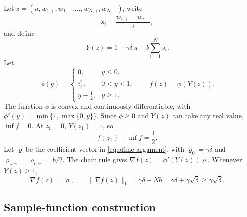 \documentclass[11pt,letterpaper]{article}
\theoremstyle{definition}
\newcommand{\grad}{\nabla}
\begin{document}
Let
$z=(u,w_{1,+},w_{1,-},\ldots,w_{N,+},w_{N,-})$,
write
\[
s_i=\frac{w_{i,+}+w_{i,-}}{2},
\]
and define
\begin{equation}
Y(z)=1+\gamma\delta\,u+b\sum_{i=1}^N s_i.
\label{eq:affine-argument}
\end{equation}
Let
\begin{equation}
\phi(y)=
\begin{cases}
0,&y\le0,\\
\frac{y^2}{2},&0<y<1,\\
y-\frac{1}{2},&y\ge1,
\end{cases}
\qquad
f(z)=\phi(Y(z)).
\label{eq:lower-objective}
\end{equation}
The function $\phi$ is convex and continuously differentiable, with
$\phi'(y)=\min\{1,\max\{0,y\}\}$. Since $\phi\ge0$ and $Y(z)$
can take any real value, $\inf f=0$. At $z_1=0$, $Y(z_1)=1$, so
\begin{equation}
f(z_1)-\inf f=\frac12.
\label{eq:lower-gap}
\end{equation}
Let $\varrho$ be the coefficient vector in \eqref{eq:affine-argument},
with $\varrho_0=\gamma\delta$ and
$\varrho_{i,+}=\varrho_{i,-}=b/2$.
The chain rule gives $\grad f(z)=\phi'(Y(z))\varrho$.
Whenever $Y(z)\ge1$,
\begin{equation}
\grad f(z)=\varrho,
\qquad
\|\grad f(z)\|_1=\gamma\delta+Nb=\gamma\delta+\gamma\sqrt\delta
\ge\gamma\sqrt\delta.
\label{eq:active-gradient}
\end{equation}

\subsection{Sample-function construction}
\end{document}
